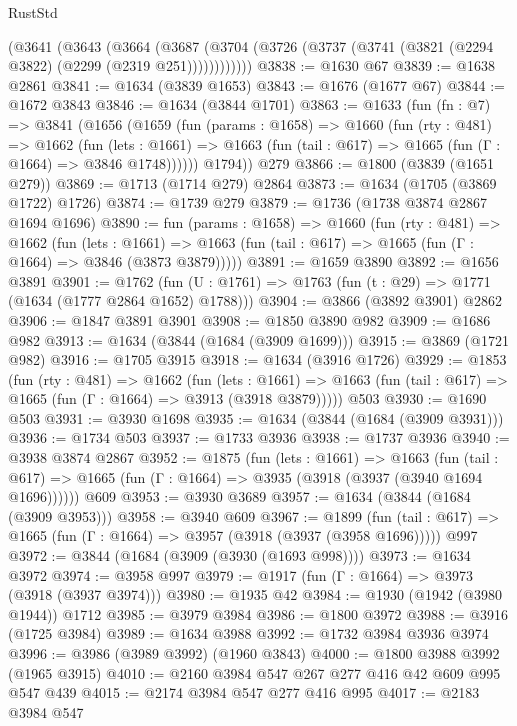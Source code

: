 \begin{lexlean}{RustStd}
\begin{coremodule}
      (@3641
        (@3643
          (@3664
            (@3687 (@3704 (@3726 (@3737 (@3741 (@3821 (@2294 @3822) (@2299 (@2319 @251))))))))))))
@3838 := @1630 @67
@3839 := @1638 @2861
@3841 := @1634 (@3839 @1653)
@3843 := @1676 (@1677 @67)
@3844 := @1672 @3843
@3846 := @1634 (@3844 @1701)
@3863 := @1633
    (fun (fn : @7) =>
    @3841
      (@1656
        (@1659
          (fun (params : @1658) =>
          @1660
            (fun (rty : @481) =>
            @1662
              (fun (lets : @1661) =>
              @1663 (fun (tail : @617) => @1665 (fun (Γ : @1664) => @3846 @1748))))))
        @1794))
    @279
@3866 := @1800 (@3839 (@1651 @279))
@3869 := @1713 (@1714 @279) @2864
@3873 := @1634 (@1705 (@3869 @1722) @1726)
@3874 := @1739 @279
@3879 := @1736 (@1738 @3874 @2867 @1694 @1696)
@3890 := fun (params : @1658) =>
  @1660
    (fun (rty : @481) =>
    @1662
      (fun (lets : @1661) =>
      @1663 (fun (tail : @617) => @1665 (fun (Γ : @1664) => @3846 (@3873 @3879)))))
@3891 := @1659 @3890
@3892 := @1656 @3891
@3901 := @1762 (fun (U : @1761) => @1763 (fun (t : @29) => @1771 (@1634 (@1777 @2864 @1652) @1788)))
@3904 := @3866 (@3892 @3901) @2862
@3906 := @1847 @3891 @3901
@3908 := @1850 @3890 @982
@3909 := @1686 @982
@3913 := @1634 (@3844 (@1684 (@3909 @1699)))
@3915 := @3869 (@1721 @982)
@3916 := @1705 @3915
@3918 := @1634 (@3916 @1726)
@3929 := @1853
    (fun (rty : @481) =>
    @1662
      (fun (lets : @1661) =>
      @1663 (fun (tail : @617) => @1665 (fun (Γ : @1664) => @3913 (@3918 @3879)))))
    @503
@3930 := @1690 @503
@3931 := @3930 @1698
@3935 := @1634 (@3844 (@1684 (@3909 @3931)))
@3936 := @1734 @503
@3937 := @1733 @3936
@3938 := @1737 @3936
@3940 := @3938 @3874 @2867
@3952 := @1875
    (fun (lets : @1661) =>
    @1663
      (fun (tail : @617) => @1665 (fun (Γ : @1664) => @3935 (@3918 (@3937 (@3940 @1694 @1696))))))
    @609
@3953 := @3930 @3689
@3957 := @1634 (@3844 (@1684 (@3909 @3953)))
@3958 := @3940 @609
@3967 := @1899
    (fun (tail : @617) => @1665 (fun (Γ : @1664) => @3957 (@3918 (@3937 (@3958 @1696)))))
    @997
@3972 := @3844 (@1684 (@3909 (@3930 (@1693 @998))))
@3973 := @1634 @3972
@3974 := @3958 @997
@3979 := @1917 (fun (Γ : @1664) => @3973 (@3918 (@3937 @3974)))
@3980 := @1935 @42
@3984 := @1930 (@1942 (@3980 @1944)) @1712
@3985 := @3979 @3984
@3986 := @1800 @3972
@3988 := @3916 (@1725 @3984)
@3989 := @1634 @3988
@3992 := @1732 @3984 @3936 @3974
@3996 := @3986 (@3989 @3992) (@1960 @3843)
@4000 := @1800 @3988 @3992 (@1965 @3915)
@4010 := @2160 @3984 @547 @267 @277 @416 @42 @609 @995 @547 @439
@4015 := @2174 @3984 @547 @277 @416 @995
@4017 := @2183 @3984 @547

\end{coremodule}
\end{lexlean}

